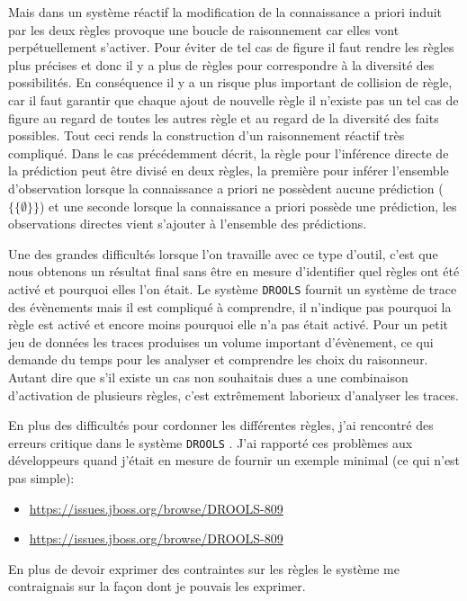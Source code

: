 \begin{refsegment}
Mais dans un système réactif la modification de la connaissance a priori induit par les deux règles provoque une boucle de raisonnement car elles vont perpétuellement s'activer. Pour éviter de tel cas de figure il faut rendre les règles plus précises et donc il y a plus de règles pour correspondre à la diversité des possibilités. En conséquence  il y a un risque plus important de collision de règle, car il faut garantir que chaque ajout de nouvelle règle il n'existe pas un tel cas de figure au regard de toutes les autres règle et au regard de la diversité des faits possibles. Tout ceci rends la construction d'un raisonnement réactif très compliqué. Dans le cas précédemment décrit, la règle  pour l'inférence directe de la  prédiction peut être divisé en deux règles, la première pour inférer l'ensemble d'observation lorsque la connaissance a priori ne possèdent aucune prédiction ($\{\{\emptyset\}\}$) et une seconde lorsque la connaissance a priori possède une prédiction, les observations directes vient s'ajouter à l'ensemble des prédictions.

Une des grandes difficultés lorsque l'on travaille avec ce type d'outil, c'est que nous obtenons un résultat final sans être en mesure d'identifier quel règles ont été activé et pourquoi elles l'on était. Le système \texttt{DROOLS} fournit un système de trace des évènements mais il est compliqué à comprendre, il n'indique pas pourquoi la règle est activé et encore moins pourquoi elle n'a pas était activé. Pour un petit jeu de données les traces produises un volume important d'évènement, ce qui demande du temps pour les analyser et comprendre les choix du raisonneur. Autant dire que s'il existe un cas non souhaitais dues a une combinaison d'activation de plusieurs règles, c'est extrêmement laborieux d'analyser les traces.

En plus des difficultés pour cordonner les différentes règles, j'ai rencontré des erreurs critique dans le système \texttt{DROOLS} . J'ai rapporté ces problèmes aux développeurs quand j'était en mesure de fournir un exemple minimal (ce qui n'est pas simple):
\begin{itemize}
	\item \url{https://issues.jboss.org/browse/DROOLS-809}
	\item \url{https://issues.jboss.org/browse/DROOLS-809}
\end{itemize}
 
En plus de devoir exprimer des contraintes sur les règles le système me contraignais sur la façon dont je pouvais les exprimer.


\end{refsegment}
